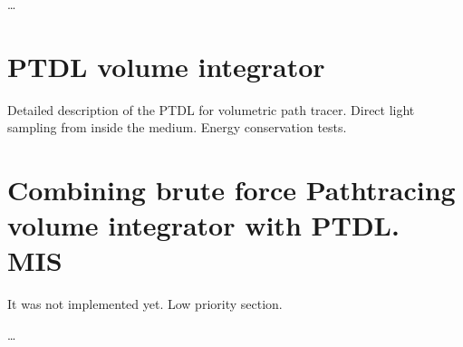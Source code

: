 \ldots

\section{PTDL volume integrator}

Detailed description of the PTDL for volumetric path tracer.
Direct light sampling from inside the medium.
Energy conservation tests.


\section{Combining brute force Pathtracing volume integrator with PTDL. MIS}
It was not implemented yet. Low priority section.

\ldots